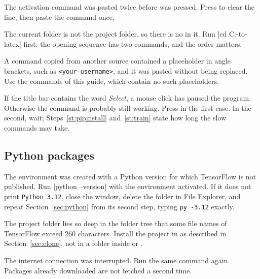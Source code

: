 \cause The activation command was pasted twice before  was pressed.
\remedy Press  to clear the line, then paste the command once.

\cause The current folder is not the project folder, so there is no  in it.
\remedy Run \code|cd C:\camera-to-latex| first: the opening sequence has two commands, and the
order matters.

\cause A command copied from another source contained a placeholder in angle brackets, such as
\texttt{<your-username>}, and it was pasted without being replaced.
\remedy Use the commands of this guide, which contain no such placeholders.

\cause If the title bar contains the word \emph{Select}, a mouse click has paused the program.
Otherwise the command is probably still working.
\remedy Press  in the first case. In the second, wait; Steps~\ref{st:pipinstall}
and~\ref{st:train} state how long the slow commands may take.

\subsection{Python packages}

\cause The environment was created with a Python version for which TensorFlow is not published.
\remedy Run \code|python --version| with the environment activated. If it does not print
\texttt{Python 3.12}, close the window, delete the folder  in File Explorer, and
repeat Section~\ref{sec:python} from its second step, typing \texttt{py -3.12} exactly.

\cause The project folder lies so deep in the folder tree that some file names of TensorFlow exceed
260 characters.
\remedy Install the project in  as described in Section~\ref{sec:clone}, not in a
folder inside  or .

\cause The internet connection was interrupted.
\remedy Run the same command again. Packages already downloaded are not fetched a second time.

